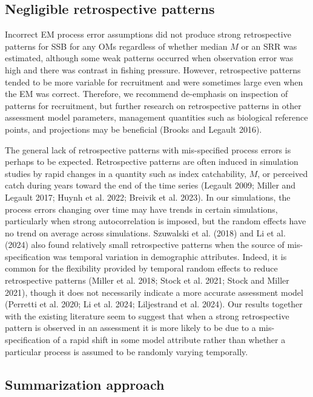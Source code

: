 \documentclass[
  12pt,
]{article}
\begin{document}
\subsection*{Negligible retrospective
patterns}\label{negligible-retrospective-patterns}

Incorrect EM process error assumptions did not produce strong
retrospective patterns for SSB for any OMs regardless of whether median
\(M\) or an SRR was estimated, although some weak patterns occurred when
observation error was high and there was contrast in fishing pressure.
However, retrospective patterns tended to be more variable for
recruitment and were sometimes large even when the EM was correct.
Therefore, we recommend de-emphasis on inspection of patterns for
recruitment, but further research on retrospective patterns in other
assessment model parameters, management quantities such as biological
reference points, and projections may be beneficial (Brooks and Legault
2016).

The general lack of retrospective patterns with mis-specified process
errors is perhaps to be expected. Retrospective patterns are often
induced in simulation studies by rapid changes in a quantity such as
index catchability, \(M\), or perceived catch during years toward the
end of the time series (Legault 2009; Miller and Legault 2017; Huynh et
al. 2022; Breivik et al. 2023). In our simulations, the process errors
changing over time may have trends in certain simulations, particularly
when strong autocorrelation is imposed, but the random effects have no
trend on average across simulations. Szuwalski et al. (2018) and Li et
al. (2024) also found relatively small retrospective patterns when the
source of mis-specification was temporal variation in demographic
attributes. Indeed, it is common for the flexibility provided by
temporal random effects to reduce retrospective patterns (Miller et al.
2018; Stock et al. 2021; Stock and Miller 2021), though it does not
necessarily indicate a more accurate assessment model (Perretti et al.
2020; Li et al. 2024; Liljestrand et al. 2024). Our results together
with the existing literature seem to suggest that when a strong
retrospective pattern is observed in an assessment it is more likely to
be due to a mis-specification of a rapid shift in some model attribute
rather than whether a particular process is assumed to be randomly
varying temporally.

\subsection*{Summarization approach}\label{summarization-approach}
\end{document}
